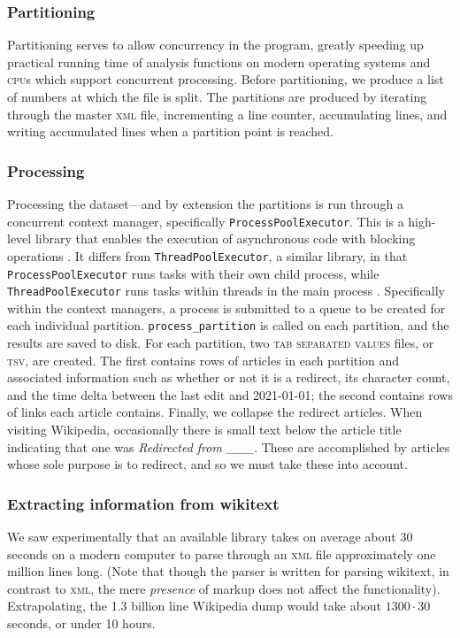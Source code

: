 \documentclass[fontsize=12pt]{article}
\newcommand{\py}[1]{\texttt{#1}}
\begin{document}
\begin{multicols}{2}
    \subsubsection{Partitioning}
    Partitioning serves to allow concurrency in the program, greatly speeding up practical running time of analysis functions on modern operating systems and \textsc{cpu}s which support concurrent processing.
    Before partitioning, we produce a list of numbers at which the file is split.
    The partitions are produced by iterating through the master \textsc{xml} file, incrementing a line counter, accumulating lines, and writing accumulated lines when a partition point is reached.

    \subsubsection{Processing}
    Processing the dataset---and by extension the partitions is run through a concurrent context manager, specifically \py{ProcessPoolExecutor}.
    This is a high-level library that enables the execution of asynchronous code with blocking operations \parencite{concurrent}.
    It differs from \py{ThreadPoolExecutor}, a similar library, in that \py{ProcessPoolExecutor} runs tasks with their own child process, while \py{ThreadPoolExecutor} runs tasks within threads in the main process \parencite{difference}.
    Specifically within the context managers, a process is submitted to a queue to be created for each individual partition.
    \py{process_partition} is called on each partition, and the results are saved to disk.
    For each partition, two \textsc{tab separated values} files, or \textsc{tsv}, are created.
    The first contains rows of articles in each partition and associated information such as whether or not it is a redirect, its character count, and the time delta between the last edit and 2021-01-01; the second contains rows of links each article contains.
    Finally, we collapse the redirect articles.
    When visiting Wikipedia, occasionally there is small text below the article title indicating that one was \emph{Redirected from \_\_\_}.
    These are accomplished by articles whose sole purpose is to redirect, and so we must take these into account.

    \subsubsection{Extracting information from wikitext}
    We saw experimentally that an available library takes on average about 30 seconds on a modern computer to parse through an \textsc{xml} file approximately one million lines long.
    (Note that though the parser is written for parsing wikitext, in contrast to \textsc{xml}, the mere \emph{presence} of markup does not affect the functionality).
    Extrapolating, the 1.3 billion line Wikipedia dump would take about \(1300 \cdot 30\) seconds, or under 10 hours.


\end{multicols}
\end{document}
